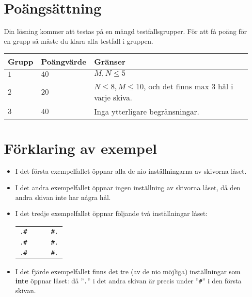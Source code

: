 \section*{Poängsättning}
Din lösning kommer att testas på en mängd testfallsgrupper.
För att få poäng för en grupp så måste du klara alla testfall i gruppen.

\noindent
\begin{tabular}{| l | l | l |}
  \hline
  \textbf{Grupp} & \textbf{Poängvärde} & \textbf{Gränser} \\ \hline
  $1$    & $40$        &  $M, N \le 5$ \\ \hline 
  $2$    & $20$        &  $N \le 8, M \le 10$, och det finns max 3 hål i varje skiva. \\ \hline 
  $3$    & $40$        &  Inga ytterligare begränsningar. \\ \hline
\end{tabular}

\section*{Förklaring av exempel}

\begin{itemize}
  \item I det första exempelfallet öppnar alla de nio inställningarna av skivorna låset.

  \item I det andra exempelfallet öppnar ingen inställning av skivorna låset, då den andra skivan inte har några hål.

  \item I det tredje exempelfallet öppnar följande två inställningar låset:

\begin{center}
  \begin{tabular}{c|c}
    {\raggedleft \texttt{.\#~~}}& {\raggedright \texttt{~~\#.}}\\
    {\raggedleft \texttt{.\#~~}}& {\raggedright \texttt{~~\#.}}\\
    {\raggedleft \texttt{.\#~~}}& {\raggedright \texttt{~~\#.}}
  \end{tabular}
\end{center}

  \item I det fjärde exempelfallet finns det tre (av de nio möjliga) inställningar som \textbf{inte} öppnar låset: då ”\texttt{.}” i det andra skivan är precis under
  ”\texttt{\#}” i den första skivan.

\end{itemize}
